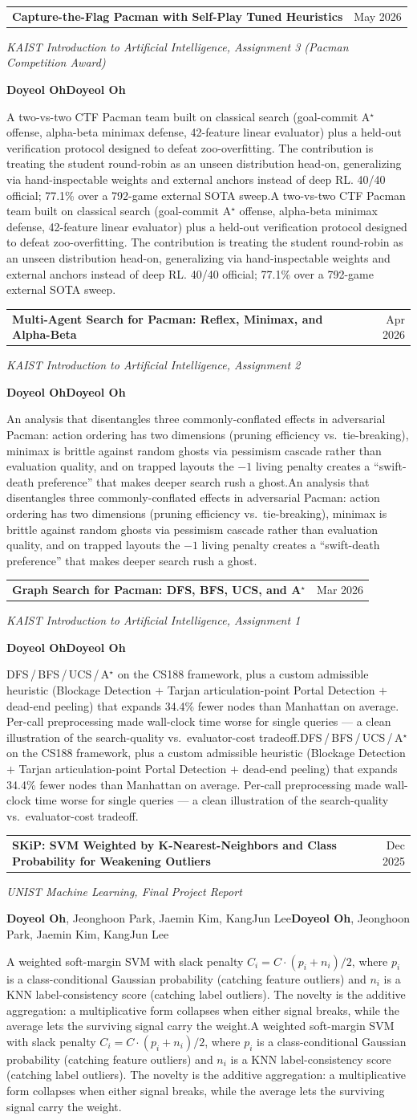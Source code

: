 \documentclass[11pt,letterpaper]{article}
\makeatletter
\newcommand{\pub}[5]{%
  \noindent\begin{tabularx}{\linewidth}{@{}X r@{}}\textbf{#1} & {#3}\end{tabularx}\par
  \noindent\emph{#2}\par
  \ifx\relax#4\relax\else\noindent #4\par\fi
  \ifx\relax#5\relax\else\noindent\small #5\par\fi
  \vspace{10pt}
}
\makeatother
\begin{document}


\pub{Capture-the-Flag Pacman with Self-Play Tuned Heuristics}
{KAIST Introduction to Artificial Intelligence, Assignment 3 (Pacman Competition Award)}
{May 2026}
{\textbf{Doyeol Oh}}
{A two-vs-two CTF Pacman team built on classical search (goal-commit A$^\star$ offense, alpha-beta minimax defense, 42-feature linear evaluator) plus a held-out verification protocol designed to defeat zoo-overfitting. The contribution is treating the student round-robin as an unseen distribution head-on, generalizing via hand-inspectable weights and external anchors instead of deep RL. 40/40 official; 77.1\% over a 792-game external SOTA sweep.}

\pub{Multi-Agent Search for Pacman: Reflex, Minimax, and Alpha-Beta}
{KAIST Introduction to Artificial Intelligence, Assignment 2}
{Apr 2026}
{\textbf{Doyeol Oh}}
{An analysis that disentangles three commonly-conflated effects in adversarial Pacman: action ordering has two dimensions (pruning efficiency vs.\ tie-breaking), minimax is brittle against random ghosts via pessimism cascade rather than evaluation quality, and on trapped layouts the $-1$ living penalty creates a ``swift-death preference'' that makes deeper search rush a ghost.}

\pub{Graph Search for Pacman: DFS, BFS, UCS, and A$^\star$}
{KAIST Introduction to Artificial Intelligence, Assignment 1}
{Mar 2026}
{\textbf{Doyeol Oh}}
{DFS\,/\,BFS\,/\,UCS\,/\,A$^\star$ on the CS188 framework, plus a custom admissible heuristic (Blockage Detection $+$ Tarjan articulation-point Portal Detection $+$ dead-end peeling) that expands 34.4\% fewer nodes than Manhattan on average. Per-call preprocessing made wall-clock time worse for single queries --- a clean illustration of the search-quality vs.\ evaluator-cost tradeoff.}

\pub{SKiP: SVM Weighted by K-Nearest-Neighbors and Class Probability for Weakening Outliers}
{UNIST Machine Learning, Final Project Report}
{Dec 2025}
{\textbf{Doyeol Oh}, Jeonghoon Park, Jaemin Kim, KangJun Lee}
{A weighted soft-margin SVM with slack penalty $C_i = C \cdot (p_i + n_i)/2$, where $p_i$ is a class-conditional Gaussian probability (catching feature outliers) and $n_i$ is a KNN label-consistency score (catching label outliers). The novelty is the additive aggregation: a multiplicative form collapses when either signal breaks, while the average lets the surviving signal carry the weight.}
\end{document}
